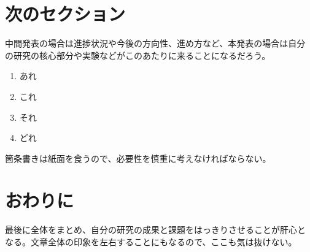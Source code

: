 \documentclass{jabstract}
\begin{document}
\begin{multicols}{2}
\section{次のセクション}
中間発表の場合は進捗状況や今後の方向性、進め方など、本発表の場合は自分
の研究の核心部分や実験などがこのあたりに来ることになるだろう。

\begin{enumerate}
\item あれ
\item これ
\item それ
\item どれ
\end{enumerate}
箇条書きは紙面を食うので、必要性を慎重に考えなければならない。

\section*{おわりに}
最後に全体をまとめ、自分の研究の成果と課題をはっきりさせることが肝心と
なる。文章全体の印象を左右することにもなるので、ここも気は抜けない。

{\small


}

\end{multicols}
\end{document}
